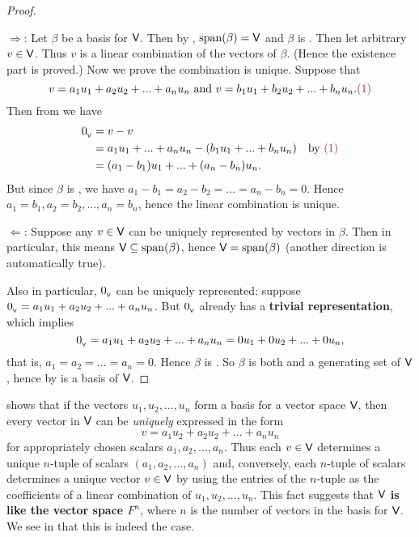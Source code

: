 \begin{proof}\ 

\(\Longrightarrow\):
Let \(\beta\) be a basis for \(\textsf{V}\).
Then by , \(\operatorname{span}(\beta) = \textsf{V}\) and \(\beta\) is \LID{}.
Then let arbitrary \(v \in \textsf{V}\).
Thus \(v\) is a linear combination of the vectors of \(\beta\).
(Hence the existence part is proved.)
Now we prove the combination is unique.
Suppose that
\[
    v = a_1 u_1 + a_2 u_2 + ... + a_n u_n \text{ and } v = b_1 u_1 + b_2 u_2 + ... + b_n u_n. \MAROON{(1)}
\]
Then from  we have
\begin{align*}
    \OV & = v - v \\
        & = a_1 u_1 + ... + a_n u_n - (b_1 u_1 + ... + b_n u_n) & \text{by \MAROON{(1)}} \\
        & = (a_1 - b_1) u_1 + ... + (a_n - b_n) u_n.
\end{align*}
But since \(\beta\) is \LID{}, we have \(a_1 - b_1 = a_2 - b_2 = ... = a_n - b_n = 0\).
Hence \(a_1 = b_1, a_2 = b_2, ..., a_n = b_n\), hence the linear combination is unique.

\(\Longleftarrow\):
Suppose any \(v \in \textsf{V}\) can be uniquely represented by vectors in \(\beta\).
Then in particular, this means \(\textsf{V} \subseteq \operatorname{span}(\beta)\), hence \(\textsf{V} = \operatorname{span}(\beta)\) (another direction is automatically true).

Also in particular, \(0_{_{\textsf{V}}}\) can be uniquely represented:
suppose \(0_{_{\textsf{V}}} = a_1 u_1 + a_2 u_2 + ... + a_n u_n\).
But \(0_{_{\textsf{V}}}\) already has a \textbf{trivial representation}, which implies
\[
    0_{_{\textsf{V}}} = a_1 u_1 + a_2 u_2 + ... + a_n u_n = 0 u_1 + 0 u_2 + ... + 0 u_n,
\]
that is, \(a_1 = a_2 = ... = a_n = 0\).
Hence \(\beta\) is \LID{}.
So \(\beta\) is both \LID{} and a generating set of \(\textsf{V}\), hence by  is a basis of \(\textsf{V}\).
\end{proof}

\begin{note}
 shows that if the vectors \(u_1, u_2, ..., u_n\) form a basis for a vector space \(\textsf{V}\), then every vector in \(\textsf{V}\) can be \emph{uniquely} expressed in the form
\[
    v = a_1 u_2 + a_2 u_2 + ... + a_n u_n
\]
for appropriately chosen scalars \(a_1, a_2, ..., a_n\).
Thus each \(v \in \textsf{V}\) determines a unique \(n\)-tuple of scalars \((a_1, a_2, ..., a_n)\) and,
conversely, each \(n\)-tuple of scalars determines a unique vector \(v \in \textsf{V}\) by using the entries of the \(n\)-tuple as the coefficients of a linear combination of \(u_1, u_2, ..., u_n\).
This fact suggests that \textbf{\(\textsf{V}\) is like the vector space \(F^n\)}, where \(n\) is the number of vectors in the basis for \(\textsf{V}\).
We see in  that this is indeed the case.
\end{note}

